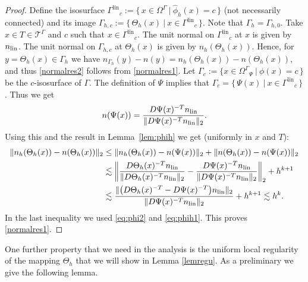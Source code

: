\documentclass[final]{siamltex}
\begin{document}
\begin{proof} 
 Define the isosurface ${\Gamma^{\text{lin}}}_c:= \{\, x \in {\Omega^{\Gamma}}~|~\hat \phi_h(x)=c \,\}$ (not necessarily connected) and its image $\Gamma_{h,c}:= \{\, \Theta_h(x)~|~x \in {\Gamma^{\text{lin}}}_c\,\}$. Note that $\Gamma_h=\Gamma_{h,0}$. Take $x \in T \in {{\mathcal T}^{\Gamma}}$ and $c$ such that $x \in {\Gamma^{\text{lin}}}_c$. The unit normal on ${\Gamma^{\text{lin}}}_c$ at $x$ is given by ${n_{\rm lin}}$. The unit normal on $\Gamma_{h,c}$ at $\Theta_h(x)$ is given by $n_h(\Theta_h(x))$. Hence, for $y=\Theta_h(x) \in \Gamma_h$ we have $n_{\Gamma_h}(y) - n(y)= n_h(\Theta_h(x))-n(\Theta_h(x))$, and thus \eqref{normalres2} follows from \eqref{normalres1}. Let $\Gamma_c:=\{ x \in {\Omega^{\Gamma}}_{\Psi}~|~ \phi(x)=c \,\}$ be the $c$-isosurface of $\Gamma$. The definition of $\Psi$ implies that
$\Gamma_c= \{\,\Psi(x)~|~x \in {\Gamma^{\text{lin}}}_c\,\}$. Thus we get 
\[ n(\Psi(x))=\frac{D\Psi(x)^{-T}{n_{\rm lin}}}{\|D\Psi(x)^{-T}{n_{\rm lin}}\|_2}. \]
Using this and the result in Lemma~\ref{lem:phih} we get (uniformly in $x$ and $T$):
\begin{align*}
 \|n_h(\Theta_h(x)) - n(\Theta_h(x))\|_2 & \leq \|n_h(\Theta_h(x)) - n(\Psi(x))\|_2 +\|n(\Theta_h(x))- n(\Psi(x))\|_2 \\
 & \lesssim \left\| \frac{D\Theta_h(x)^{-T}{n_{\rm lin}}}{\|D\Theta_h(x)^{-T}{n_{\rm lin}}\|_2} - \frac{D\Psi(x)^{-T}{n_{\rm lin}}}{\|D\Psi(x)^{-T}{n_{\rm lin}}\|_2} \right\|_2 + h^{k+1} \\
 & \lesssim\frac{ \Vert \big(D\Theta_h(x)^{-T}- D\Psi(x)^{-T} \big){n_{\rm lin}} \Vert_2}{\|D\Psi(x)^{-T}{n_{\rm lin}}\|_2} + h^{k+1} \lesssim h^k.
\end{align*}
In the last inequality we used \eqref{eq:phi2} and \eqref{eq:phih1}. This proves \eqref{normalres1}.
\end{proof}

One further property that we need in the analysis is the uniform local regularity of the mapping $\Theta_h$ that we will show in Lemma \ref{lemregu}. As a preliminary we give the following lemma.
\end{document}
